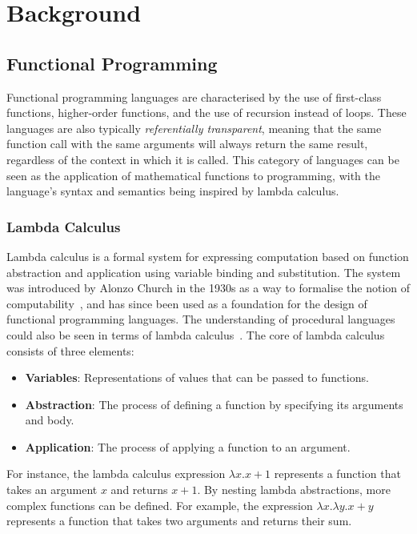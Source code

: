 \chapter{Background}
\label{ch:background}

\section{Functional Programming}

Functional programming languages are characterised by the use of first-class functions, higher-order
functions, and the use of recursion instead of loops. These languages are also typically
\emph{referentially transparent}, meaning that the same function call with the same arguments will
always return the same result, regardless of the context in which it is called. This category
of languages can be seen as the application of mathematical functions to programming, with the
language's syntax and semantics being inspired by lambda calculus.

\subsection{Lambda Calculus}

Lambda calculus is a formal system for expressing computation based on function abstraction and
application using variable binding and substitution. The system was introduced by Alonzo Church in
the 1930s as a way to formalise the notion of computability~\autocite{church1936lambda}, and has
since been used as a foundation for the design of functional programming languages. The
understanding of procedural languages could also be seen in terms of lambda
calculus~\autocite{landin1965lambda}. The core of lambda calculus consists of three elements:

\begin{itemize}
    \onehalfspacing
    \item \textbf{Variables}: Representations of values that can be passed to functions.
    \item \textbf{Abstraction}: The process of defining a function by specifying its arguments and
          body.
    \item \textbf{Application}: The process of applying a function to an argument.
\end{itemize}

For instance, the lambda calculus expression \(\lambda x. x + 1\) represents a function that takes
an argument \(x\) and returns \(x + 1\). By nesting lambda abstractions, more complex functions can
be defined. For example, the expression \(\lambda x. \lambda y. x + y\) represents a function that
takes two arguments and returns their sum.


